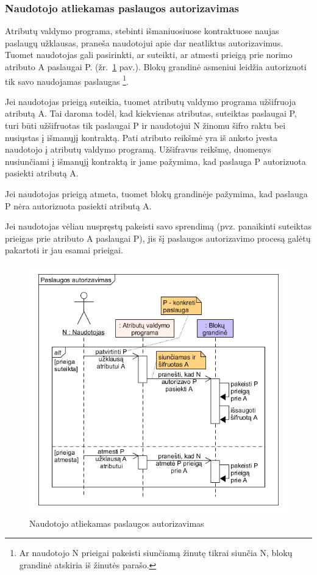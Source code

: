 \subsubsection{Naudotojo atliekamas paslaugos autorizavimas}

Atributų valdymo programa, stebinti išmaniuosiuose kontraktuose naujas paslaugų užklausas, praneša naudotojui apie dar
neatliktus autorizavimus. Tuomet naudotojas gali pasirinkti, ar suteikti, ar atmesti prieigą prie norimo atributo
A paslaugai P. (žr.\hypertarget{fig:givePermissions}{~\ref{fig:givePermissions} pav.}). Blokų grandinė asmeniui leidžia autorizuoti tik savo naudojamas paslaugas
\footnote{ Ar naudotojo N prieigai pakeisti siunčiamą žinutę tikrai siunčia N, blokų grandinė atskiria iš žinutės parašo.}.

Jei naudotojas prieigą suteikia, tuomet atributų valdymo programa užšifruoja atributą A. Tai
daroma todėl, kad kiekvienas atributas, suteiktas paslaugai P, turi būti užšifruotas tik paslaugai P ir naudotojui N
žinomu šifro raktu bei nusiųstas
į išmanųjį kontraktą. Pati atributo reikšmė yra iš anksto įvesta naudotojo į atributų valdymo programą.
Užšifravus reikšmę, duomenys nusiunčiami į išmanųjį kontraktą ir jame pažymima, kad paslauga P autorizuota
pasiekti atributą A.

Jei naudotojas prieigą atmeta, tuomet blokų grandinėje pažymima, kad paslauga P nėra autorizuota pasiekti atributą A.

Jei naudotojas vėliau nuspręstų pakeisti savo sprendimą (pvz. panaikinti suteiktas prieigas prie atributo A paslaugai P),
jis šį paslaugos autorizavimo procesą galėtų pakartoti ir jau esamai prieigai.


\begin{figure}[h]
    \centering
    \includegraphics[scale=0.65]{img/givePermissions}
    \caption{Naudotojo atliekamas paslaugos autorizavimas}
    \label{fig:givePermissions}
\end{figure}

